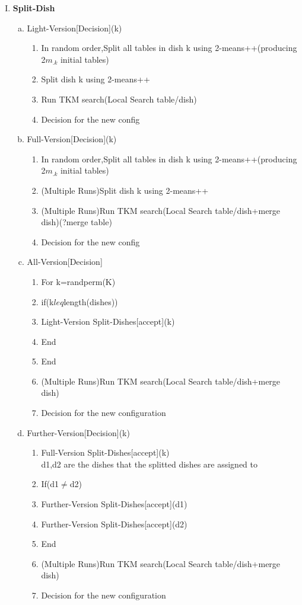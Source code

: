 \documentclass{article}
\begin{document}
\begin{spacing}{1.1}
\begin{enumerate}[(I)]
\begin{enumerate}[(a)]
\end{enumerate}
\item {\bf Split-Dish}
\begin{enumerate}[(a)]
 \item Light-Version[Decision](k)
\begin{enumerate}[(1)]
\item In random order,Split all tables in dish k using 2-means++(producing 2$m_{.k}$ initial tables) 
\item Split dish k using 2-means++
\item Run TKM search(Local Search table/dish)
\item Decision for the new config
\end{enumerate}
 \item Full-Version[Decision](k)
\begin{enumerate}[(1)]
\item In random order,Split all tables in dish k using 2-means++(producing 2$m_{.k}$ initial tables) 
\item (Multiple Runs)Split dish k using 2-means++
\item (Multiple Runs)Run TKM search(Local Search table/dish+merge dish)(?merge table)
\item Decision for the new config
\end{enumerate}
\item All-Version[Decision]
\begin{enumerate}[(1)]
\item For k=randperm(K)
\item if(k$leq$length(dishes))
\item Light-Version Split-Dishes[accept](k)
\item End
\item End
\item (Multiple Runs)Run TKM search(Local Search table/dish+merge dish)
\item Decision for the new configuration
\end{enumerate}
\item Further-Version[Decision](k)
\begin{enumerate}[(1)]
\item Full-Version Split-Dishes[accept](k)\\
 d1,d2 are the dishes that the splitted dishes are assigned to
\item If(d1$\neq$d2)
\item Further-Version Split-Dishes[accept](d1)
\item Further-Version Split-Dishes[accept](d2)
\item End
\item (Multiple Runs)Run TKM search(Local Search table/dish+merge dish)
\item Decision for the new configuration
\end{enumerate}


\end{enumerate}
\end{enumerate}
\end{spacing}
\end{document}
